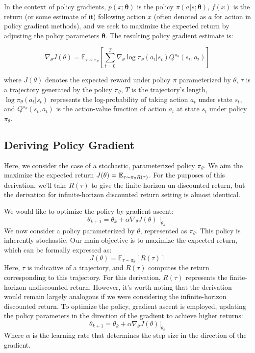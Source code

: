 In the context of policy gradients, $p(x; \boldsymbol{\theta})$ is the policy $\pi(a|s; \boldsymbol{\theta})$, $f(x)$ is the return (or some estimate of it) following action $x$ (often denoted as $a$ for action in policy gradient methods), and we seek to maximize the expected return by adjusting the policy parameters $\boldsymbol{\theta}$. The resulting policy gradient estimate is:

\begin{equation}
\nabla_{\theta} J(\theta) = \mathbb{E}_{\tau \sim \pi_\theta} \left[\sum_{t=0}^{T} \nabla_{\theta} \log \pi_{\theta}(a_t|s_t) Q^{\pi_{\theta}}(s_t, a_t)\right]
\end{equation}

where $J(\theta)$ denotes the expected reward under policy $\pi$ parameterized by $\theta$, $\tau$ is a trajectory generated by the policy $\pi_\theta$, $T$ is the trajectory's length, $\log \pi_{\theta}(a_t|s_t)$ represents the log-probability of taking action $a_t$ under state $s_t$, and $Q^{\pi_{\theta}}(s_t, a_t)$ is the action-value function of action $a_t$ at state $s_t$ under policy $\pi_{\theta}$.


\subsection{Deriving Policy Gradient}
Here, we consider the case of a stochastic, parameterized policy $\pi_{\theta}$. We aim the maximize the expected return $J(\theta) = \mathbb E_{\tau \sim \pi_{\theta} R(\tau)}$. For the purposes of this derivation, we'll take $R(\tau)$ to give the finite-horizon un discounted return, but the derivation for infinite-horizon discounted return setting is almost identical.

We would like to optimize the policy by gradient ascent:
$$
\theta_{k+1} = \theta_{k} + \alpha \nabla_{\theta} J(\theta) \mid_{\theta_k}
$$
We now consider a policy parameterized by $\theta$, represented as $\pi_{\theta}$. This policy is inherently stochastic. Our main objective is to maximize the expected return, which can be formally expressed as:
\[
J(\theta) = \mathbb{E}_{\tau \sim \pi_{\theta}} [R(\tau)]
\]
Here, $\tau$ is indicative of a trajectory, and $R(\tau)$ computes the return corresponding to this trajectory. For this derivation, $R(\tau)$ represents the finite-horizon undiscounted return. However, it's worth noting that the derivation would remain largely analogous if we were considering the infinite-horizon discounted return.
To optimize the policy, gradient ascent is employed, updating the policy parameters in the direction of the gradient to achieve higher returns:
\[
\theta_{k+1} = \theta_{k} + \alpha \nabla_{\theta} J(\theta) \bigg|_{\theta_k}
\]
Where $\alpha$ is the learning rate that determines the step size in the direction of the gradient.

